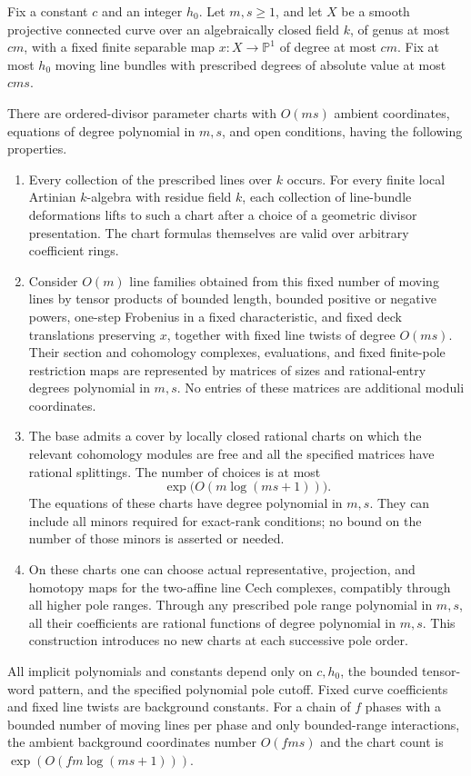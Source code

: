 \begin{proposition}
\label{D:moving-line-polynomial-background}
Fix a constant $c$ and an integer $h_0$. Let $m,s\geq1$, and
let $X$ be a smooth projective connected curve over an
algebraically closed field $k$, of genus at most $cm$, with a
fixed finite separable map $x:X\to\mathbb P^1$ of degree at
most $cm$. Fix at most $h_0$ moving line bundles with prescribed
degrees of absolute value at most $cms$.

There are ordered-divisor parameter charts with $O(ms)$ ambient
coordinates, equations of degree polynomial in $m,s$, and open
conditions, having the following properties.
\begin{enumerate}
\item Every collection of the prescribed lines over $k$ occurs.
For every finite local Artinian $k$-algebra with residue field $k$,
each collection of line-bundle deformations lifts to such a chart
after a choice of a geometric divisor presentation. The chart
formulas themselves are valid over arbitrary coefficient rings.
\item Consider $O(m)$ line families obtained from this fixed
number of moving lines by tensor products of bounded length,
bounded positive or negative powers, one-step Frobenius in a
fixed characteristic, and fixed deck translations preserving
$x$, together with fixed line twists of degree $O(ms)$.
Their section and cohomology complexes, evaluations, and fixed
finite-pole restriction maps are represented by matrices of
sizes and rational-entry degrees polynomial in $m,s$.
No entries of these matrices are additional moduli coordinates.
\item The base admits a cover by locally closed rational charts
on which the relevant cohomology modules are free and all the
specified matrices have rational splittings. The number of
choices is at most
\[
                      \exp\bigl(O(m\log(ms+1))\bigr).     \tag{B.MB.2}
\]
The equations of these charts have degree polynomial in $m,s$.
They can include all minors required for exact-rank conditions;
no bound on the number of those minors is asserted or needed.
\item On these charts one can choose actual representative,
projection, and homotopy maps for the two-affine line Cech
complexes, compatibly through all higher pole ranges. Through
any prescribed pole range polynomial in $m,s$, all their
coefficients are rational functions of degree polynomial in
$m,s$. This construction introduces no new charts at each
successive pole order.
\end{enumerate}
All implicit polynomials and constants depend only on $c,h_0$,
the bounded tensor-word pattern, and the specified polynomial
pole cutoff. Fixed curve coefficients and fixed line twists are
background constants. For a chain of $f$ phases with a bounded
number of moving lines per phase and only bounded-range
interactions, the ambient background coordinates number
$O(fms)$ and the chart count is
$\exp(O(fm\log(ms+1)))$.


\end{proposition}
